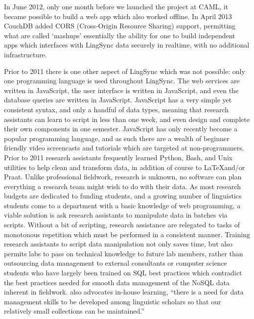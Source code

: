 \documentclass[12pt]{article}
\begin{document}
In June 2012, only one month before we launched the project at CAML, it became possible to build a web app which also worked offline. 
 In April 2013 CouchDB added CORS (Cross-Origin Resource Sharing) support,  permitting what are called `mashups' essentially the ability for one to build  independent apps which interfaces with LingSync data securely in realtime, with no additional infrastructure. 

Prior to 2011 there is one other aspect of LingSync which was not possible: only one programming language is used throughout LingSync. The web services are written in JavaScript, the user interface is written in JavaScript, and even the database queries are written in JavaScript. JavaScript has a very simple yet consistent syntax, and only a handful of data types, meaning that research assistants can learn to script in less than one week, and even design and complete their own components in one semester. JavaScript has only recently become a popular programming language, and as such there are a wealth of beginner friendly video screencasts and tutorials which are targeted at non-programmers. Prior to 2011 research assistants frequently learned Python, Bash, and Unix utilities to help clean and transform data,  in addition of course to \LaTeX  and/or Praat. Unlike professional fieldwork, research is unknown, no software can plan everything a research team might wish to do with their data.  As most research budgets are dedicated to funding students, and a growing number of linguistics students come to a department with a basic knowledge of web programming, a viable solution is ask research assistants to manipulate data in batches via scripts. Without a bit of scripting, research assistance are relegated to tasks of monotonous repetition which must be performed in a consistent manner. Training research assistants to script data manipulation not only saves time, but also permits labs to pass on technical knowledge to future lab members, rather than outsourcing  data management to external consultants or computer science students who have largely been trained on SQL best practices which contradict the best practices  needed for smooth data management of the NoSQL data inherent in fieldwork. \cite{Thieberger:2012} also advocates in-house learning, ``there is a need for data management skills to be developed among linguistic scholars so that our relatively small collections can be maintained.''%
\end{document}
